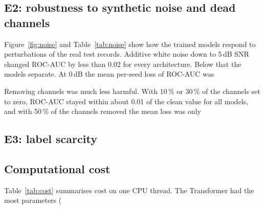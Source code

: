 \subsection*{E2: robustness to synthetic noise and dead channels}
Figure~\ref{fig:noise} and Table~\ref{tab:noise} show how the trained models respond to perturbations of the real test records. Additive white noise down to 5\,dB SNR changed ROC-AUC by less than 0.02 for every architecture. Below that the models separate. At 0\,dB the mean per-seed loss of ROC-AUC was %

Removing channels was much less harmful. With 10\,\% or 30\,\% of the channels set to zero, ROC-AUC stayed within about 0.01 of the clean value for all models, and with 50\,\% of the channels removed the mean loss was only %

\subsection*{E3: label scarcity}

\subsection*{Computational cost}
Table~\ref{tab:cost} summarises cost on one CPU thread. The Transformer had the most parameters (%
